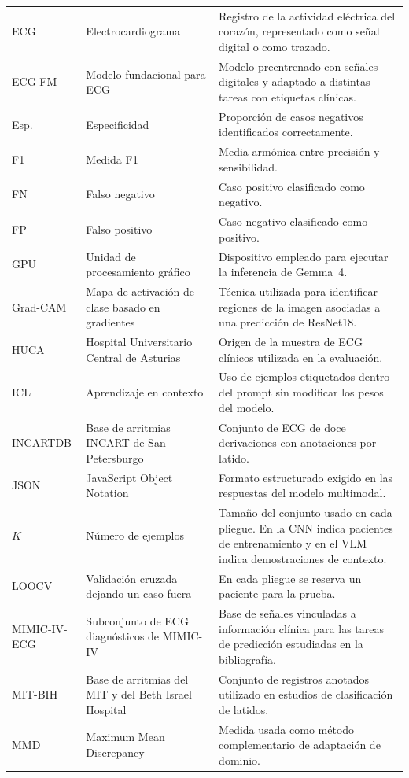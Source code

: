 {\begin{longtable}{@{}>{\raggedright\arraybackslash}p{2.20cm}>{\raggedright\arraybackslash}p{4.10cm}>{\raggedright\arraybackslash}p{7.95cm}@{}}
ECG & Electrocardiograma & Registro de la actividad eléctrica del corazón, representado como señal digital o como trazado. \\
ECG-FM & Modelo fundacional para ECG & Modelo preentrenado con señales digitales y adaptado a distintas tareas con etiquetas clínicas. \\
Esp. & Especificidad & Proporción de casos negativos identificados correctamente. \\
F1 & Medida F1 & Media armónica entre precisión y sensibilidad. \\
FN & Falso negativo & Caso positivo clasificado como negativo. \\
FP & Falso positivo & Caso negativo clasificado como positivo. \\
GPU & Unidad de procesamiento gráfico & Dispositivo empleado para ejecutar la inferencia de Gemma~4. \\
Grad-CAM & Mapa de activación de clase basado en gradientes & Técnica utilizada para identificar regiones de la imagen asociadas a una predicción de ResNet18. \\
HUCA & Hospital Universitario Central de Asturias & Origen de la muestra de ECG clínicos utilizada en la evaluación. \\
ICL & Aprendizaje en contexto & Uso de ejemplos etiquetados dentro del prompt sin modificar los pesos del modelo. \\
INCARTDB & Base de arritmias INCART de San Petersburgo & Conjunto de ECG de doce derivaciones con anotaciones por latido. \\
JSON & JavaScript Object Notation & Formato estructurado exigido en las respuestas del modelo multimodal. \\
\(K\) & Número de ejemplos & Tamaño del conjunto usado en cada pliegue. En la CNN indica pacientes de entrenamiento y en el VLM indica demostraciones de contexto. \\
LOOCV & Validación cruzada dejando un caso fuera & En cada pliegue se reserva un paciente para la prueba. \\
MIMIC-IV-ECG & Subconjunto de ECG diagnósticos de MIMIC-IV & Base de señales vinculadas a información clínica para las tareas de predicción estudiadas en la bibliografía. \\
MIT-BIH & Base de arritmias del MIT y del Beth Israel Hospital & Conjunto de registros anotados utilizado en estudios de clasificación de latidos. \\
MMD & Maximum Mean Discrepancy & Medida usada como método complementario de adaptación de dominio. \\

\end{longtable}}
